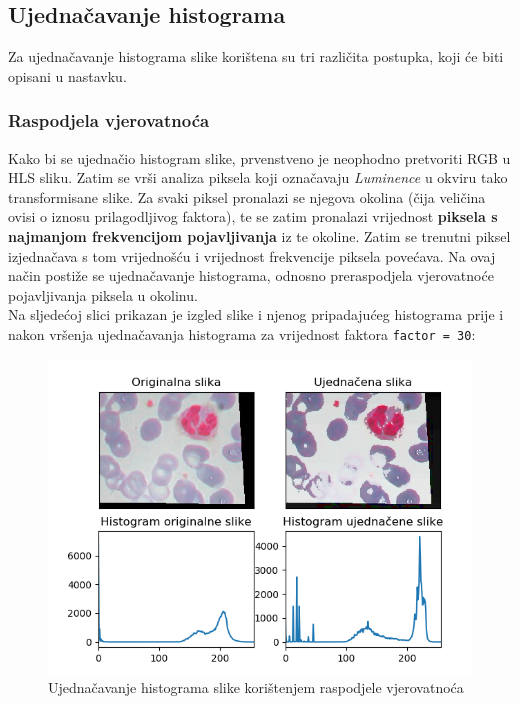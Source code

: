 \documentclass[12pt,a4paper]{article}
\begin{document}
\subsection{Ujednačavanje histograma}

Za ujednačavanje histograma slike korištena su tri različita postupka, koji će biti opisani u nastavku.

\subsubsection{Raspodjela vjerovatnoća}

Kako bi se ujednačio histogram slike, prvenstveno je neophodno pretvoriti RGB u HLS sliku. Zatim se vrši analiza piksela koji označavaju \textit{Luminence} u okviru tako transformisane slike. Za svaki piksel pronalazi se njegova okolina (čija veličina ovisi o iznosu prilagodljivog faktora), te se zatim pronalazi vrijednost \textbf{piksela s najmanjom frekvencijom pojavljivanja} iz te okoline. Zatim se trenutni piksel izjednačava s tom vrijednošću i vrijednost frekvencije piksela povećava. Na ovaj način postiže se ujednačavanje histograma, odnosno preraspodjela vjerovatnoće pojavljivanja piksela u okolinu. \\

Na sljedećoj slici prikazan je izgled slike i njenog pripadajućeg histograma prije i nakon vršenja ujednačavanja histograma za vrijednost faktora \texttt{factor = 30}:

\begin{figure}[H]

\center
\includegraphics[scale=0.9]{s9Histogram1.png}
\caption{Ujednačavanje histograma slike korištenjem raspodjele vjerovatnoća}

\end{figure}
\end{document}
